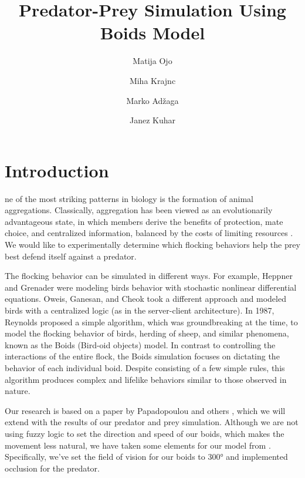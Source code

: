 \documentclass[9pt]{pnas-new}
\title{Predator-Prey Simulation Using Boids Model}
\author{Matija Ojo}
\author{Miha Krajnc}
\author{Marko Adžaga}
\author{Janez Kuhar}
\affil{Collective behavior course research seminar report}
\begin{document}
\verticaladjustment{-2pt}

\maketitle
\thispagestyle{firststyle}

\section*{Introduction}

ne of the most striking patterns in biology is the formation of animal aggregations.
Classically, aggregation has been viewed as an evolutionarily advantageous state, in which members derive the benefits of protection, mate choice, and centralized information, balanced by the costs of limiting resources \cite{complexity_pattern}.
We would like to experimentally determine which flocking behaviors help the prey best defend itself against a predator.

The flocking behavior can be simulated in different ways.
For example, Heppner and Grenader \cite{Heppner_nonlinear_model} were modeling birds behavior with stochastic nonlinear differential equations.
Oweis, Ganesan, and Cheok \cite{centralized_flocking} took a different approach and modeled birds with a centralized logic (as in the server-client architecture).
In 1987, Reynolds \cite{reynolds1987flocks} proposed a simple algorithm, which was groundbreaking at the time, to model the
flocking behavior of birds, herding of sheep, and similar phenomena, known as the Boids (Bird-oid objects) model.
In contrast to controlling the interactions of the entire flock, the Boids simulation focuses on
dictating the behavior of each individual boid. Despite consisting of a few simple rules, this
algorithm produces complex and lifelike behaviors similar to those observed in nature.

Our research is based on a paper by Papadopoulou and others \cite{papadopoulou2022emergence}, which we will extend with the results of our predator and prey simulation.
Although we are not using fuzzy logic to set the direction and speed of our boids, which makes the movement less natural, we have taken some elements for our model from
\cite{JDemsar_predator_attacks}. Specifically, we've set the field of vision for our boids to 300° and implemented occlusion for the predator.
\end{document}
